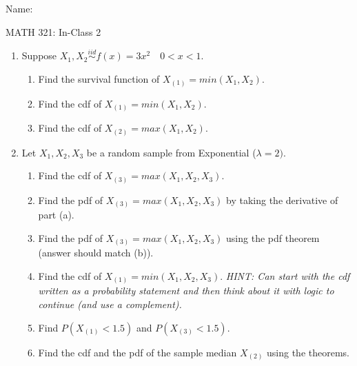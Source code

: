 \documentclass{article}
\newcommand{\order}[2]{#1_{(#2)}}		%
\begin{document}
\hspace{375pt}Name:

\begin{center}
{\Huge MATH 321: In-Class 2}
\end{center}

\bigskip\bigskip


\begin{enumerate}
    \item Suppose $X_1, X_2 \overset{iid}\sim f(x) = 3x^2 \quad 0 < x < 1$.
    \begin{enumerate}%
        \item Find the survival function of $\order{X}{1} = min(X_1, X_2)$.\vspace{80pt}
        \item Find the cdf of $\order{X}{1} = min(X_1, X_2)$.\vspace{40pt}
        \item Find the cdf of $\order{X}{2} = max(X_1, X_2)$.\vspace{80pt}
    \end{enumerate}\bigskip
    
    \item Let $X_1, X_2, X_3$ be a random sample from Exponential ($\lambda = 2)$.
    \begin{enumerate}%
        \item Find the cdf of $\order{X}{3} = max(X_1, X_2, X_3)$.\vspace{100pt}
        \item Find the pdf of $\order{X}{3} = max(X_1, X_2, X_3)$ by taking the derivative of part (a).\vspace{100pt}
        \item Find the pdf of $\order{X}{3} = max(X_1, X_2, X_3)$ using the pdf theorem (answer should match (b)).\vspace{80pt}
        \item Find the cdf of $\order{X}{1} = min(X_1, X_2, X_3)$. \textit{HINT: Can start with the cdf written as a probability statement and then think about it with logic to continue (and use a complement).}\vspace{130pt}
        \item Find $P(\order{X}{1} < 1.5)$ and $P(\order{X}{3} < 1.5)$.\vspace{80pt}
        \item Find the cdf and the pdf of the sample median $\order{X}{2}$ using the theorems.\vspace{150pt}
    \end{enumerate}\bigskip
    

\end{enumerate}
\end{document}
